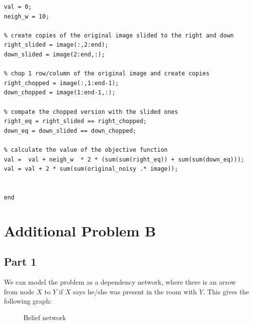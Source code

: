 \documentclass[11pt,a4paper,oneside]{report}
\begin{document}
\begin{lstlisting}
val = 0;
neigh_w = 10;

% create copies of the original image slided to the right and down
right_slided = image(:,2:end);
down_slided = image(2:end,:);

% chop 1 row/column of the original image and create copies
right_chopped = image(:,1:end-1);
down_chopped = image(1:end-1,:);

% compate the chopped version with the slided ones
right_eq = right_slided == right_chopped;
down_eq = down_slided == down_chopped;

% calculate the value of the objective function
val =  val + neigh_w  * 2 * (sum(sum(right_eq)) + sum(sum(down_eq)));
val = val + 2 * sum(sum(original_noisy .* image));


end
\end{lstlisting}

\section*{Additional Problem B}

\subsection*{Part 1}

We can model the problem as a dependency network, where there is an arrow from 
node $X$ to $Y$ if $X$ says he/she was present in the room with $Y$. This gives 
the following graph:

\begin{figure}[H]
  \centering
    \caption{Belief network}
    \label{fig:do_calc_DAG}    
\end{figure}
\end{document}
